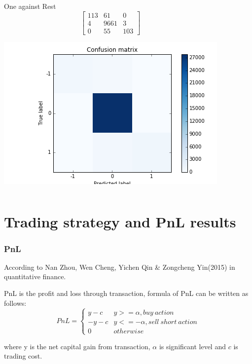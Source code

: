 \documentclass[xcolor={x11names,svgnames,dvipsnames}]{beamer}
\begin{document}
\begin{frame}
\begin{columns}
	\begin{block}{One against Rest}
\begin{equation*}       
\left[           
  \begin{array}{ccc}   
    113&    61 &    0\\  
     4& 9661& 3\\  
    0  & 55 & 103
  \end{array}
\right]               
\end{equation*}
\begin{center}
     \includegraphics[width=1\textwidth, height=0.45\textheight]{one_vs_rest.png}
\end{center}     
\end{block}
\end{columns}

\end{frame}


\section{Trading strategy and PnL results}

\begin{frame}
\frametitle{PnL}
According to Nan Zhou, Wen Cheng, Yichen Qin & Zongcheng Yin(2015) in quantitative finance.

PnL is the profit and loss through transaction, formula of PnL can be written as follows:\\
\begin{equation*}       
PnL=\left\{          
  \begin{array}{ll}   
    y-c  & y>=\alpha, buy\ action   \\  
     -y-c & y<=-\alpha, sell\ short\ action \\
     0 & otherwise
  \end{array}
\right.       
\end{equation*}

where y is the net capital gain from transaction, $\alpha$ is significant level and $c$ is trading cost.
\end{frame}
\end{document}
